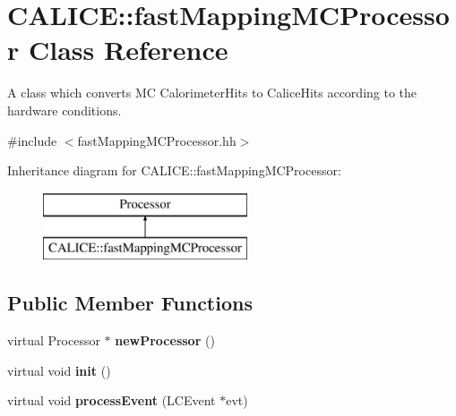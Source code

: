 \section{C\-A\-L\-I\-C\-E\-:\-:fast\-Mapping\-M\-C\-Processor Class Reference}
\label{classCALICE_1_1fastMappingMCProcessor}


A class which converts M\-C Calorimeter\-Hits to Calice\-Hits according to the hardware conditions.  




{\ttfamily \#include $<$fast\-Mapping\-M\-C\-Processor.\-hh$>$}

Inheritance diagram for C\-A\-L\-I\-C\-E\-:\-:fast\-Mapping\-M\-C\-Processor\-:\begin{figure}[H]
\begin{center}
\leavevmode
\includegraphics[height=2.000000cm]{classCALICE_1_1fastMappingMCProcessor}
\end{center}
\end{figure}
\subsection*{Public Member Functions}
\begin{DoxyCompactItemize}
\item 
virtual Processor $\ast$ {\bfseries new\-Processor} ()\label{classCALICE_1_1fastMappingMCProcessor_ab06a418d8f426b4f376038e15648f805}

\item 
virtual void {\bfseries init} ()\label{classCALICE_1_1fastMappingMCProcessor_ac553a3f1f37551ea82ec357033a94627}

\item 
virtual void {\bfseries process\-Event} (L\-C\-Event $\ast$evt)\label{classCALICE_1_1fastMappingMCProcessor_a421b8d6a2de101b449bd113174e765a3}

\end{DoxyCompactItemize}

